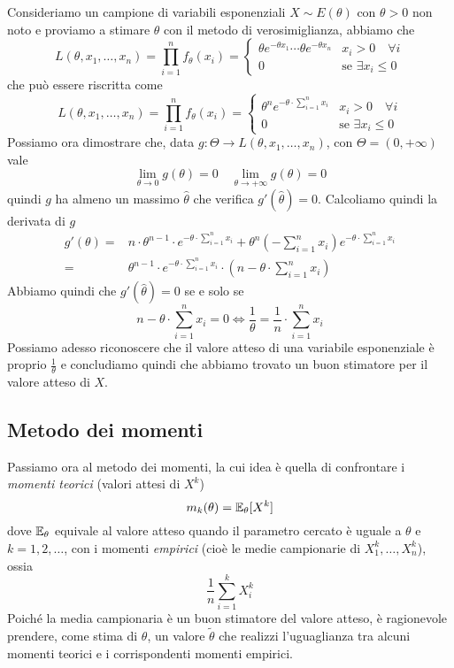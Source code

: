 \begin{example}
	Consideriamo un campione di variabili esponenziali $X \sim E(\theta)$ con $\theta > 0$ non noto
	e proviamo a stimare $\theta$ con il metodo di verosimiglianza, abbiamo che
	\[
		L(\theta, x_1, \dots, x_n) = \prod_{i=1}^n f_\theta(x_i) =
		\begin{cases}
			\theta e^{-\theta x_1} \cdots \theta e^{-\theta x_n} & x_i > 0 \quad \forall i       \\
			0                                                    & \text{se } \exists x_i \leq 0
		\end{cases}
	\]
	che può essere riscritta come
	\[
		L(\theta, x_1, \dots, x_n) =
		\prod_{i=1}^n f_\theta(x_i) =
		\begin{cases}
			\theta^n e^{-\theta \cdot \sum_{i=1}^{n} x_i} & x_i > 0 \quad \forall i       \\
			0                                             & \text{se } \exists x_i \leq 0
		\end{cases}
	\]
	Possiamo ora dimostrare che, data $g : \Theta \to L(\theta, x_1, \dots, x_n)$, con
	$\Theta = (0, +\infty)$ vale
	\[ \lim_{\theta \to 0} g(\theta) = 0 \quad \lim_{\theta \to +\infty} g(\theta) = 0 \]
	quindi $g$ ha almeno un massimo $\hat{\theta}$ che verifica $g'(\hat{\theta}) = 0$. Calcoliamo
	quindi la derivata di $g$
	\begin{align*}
		g'(\theta) = & n \cdot \theta^{n-1} \cdot e^{-\theta \cdot \sum_{i=1}^n x_i} +
		\theta^n \left( -\sum_{i=1}^{n} x_i \right) e^{-\theta \cdot \sum_{i=1}^{n} x_i} \\
		=            & \theta^{n-1} \cdot e^{-\theta \cdot \sum_{i=1}^{n} x_i} \cdot
		\left(n - \theta \cdot \sum_{i=1}^{n} x_i \right)
	\end{align*}
	Abbiamo quindi che $g'(\hat{\theta}) = 0$ se e solo se
	\[
		n - \theta \cdot \sum_{i=1}^{n} x_i = 0 \iff
		\frac{1}{\theta} = \frac{1}{n} \cdot \sum_{i=1}^{n} x_i
	\]
	Possiamo adesso riconoscere che il valore atteso di una variabile esponenziale è proprio
	$\frac{1}{\theta}$ e concludiamo quindi che abbiamo trovato un buon stimatore per il valore
	atteso di $X$.
\end{example}

\subsection{Metodo dei momenti}
Passiamo ora al metodo dei momenti, la cui idea è quella di confrontare i \emph{momenti teorici}
(valori attesi di $X^k$)
\[ m_k(\theta) = \mathbb{E}_\theta [X^k] \]
dove $\mathbb{E}_\theta$ equivale al valore atteso quando il parametro cercato è uguale a $\theta$ e
$k = 1,2,\dots$, con i momenti \emph{empirici} (cioè le medie campionarie di $X_1^k, \dots, X_n^k$),
ossia
\[ \frac{1}{n} \sum_{i=1}^k X_i^k \]
Poiché la media campionaria è un buon stimatore del valore atteso, è ragionevole prendere, come
stima di $\theta$, un valore $\tilde{\theta}$ che realizzi l'uguaglianza tra alcuni momenti teorici
e i corrispondenti momenti empirici.

